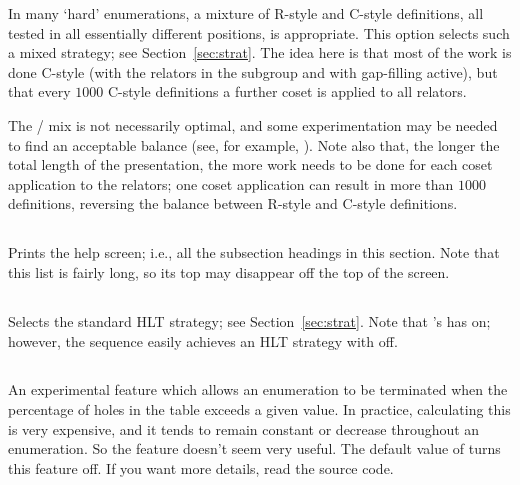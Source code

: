 In many `hard' enumerations, a mixture of R-style and C-style definitions,
  all tested in all essentially different positions, is appropriate.
This option selects such a mixed strategy; see Section~\ref{sec:strat}.
The idea here is that most of the work is done C-style (with the relators
  in the subgroup and with gap-filling active), but that every $1000$
  C-style definitions a further coset is applied to all relators.

The / mix is not necessarily optimal, and some
  experimentation may be needed to find an acceptable balance (see, for
  example, \cite{HR01}).
Note also that, the longer the total length of the presentation, the more
  work needs to be done for each coset application to the relators; one
  coset application can result in more than $1000$ definitions, reversing
  the balance between R-style and C-style definitions.

\subsection{}

Prints the help screen; i.e., all the subsection headings in this section.
Note that this list is fairly long, so its top may disappear off the top 
  of the screen.

\subsection{}

Selects the standard HLT strategy; see Section~\ref{sec:strat}.
Note that \ace's  has  on; however, the
  sequence  easily achieves an HLT strategy
  with  off.

\subsection{}

An experimental feature which allows an enumeration to be terminated when
  the percentage of holes in the table exceeds a given value.
In practice, calculating this is very expensive, and it tends to remain
  constant or decrease throughout an enumeration.
So the feature doesn't seem very useful.
The default value of  turns this feature off.
If you want more details, read the source code.

\subsection{}


